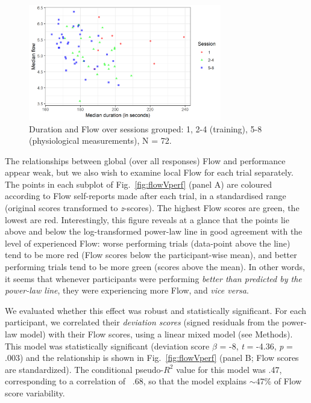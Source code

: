 \documentclass[fleqn,10pt]{wlscirep}
\newcommand{\nicewidth}{0.75\textwidth}
\begin{document}
\begin{figure}[!b]
  \centering
  \includegraphics[width=\nicewidth]{session_flowDuration_v3}
  \caption{Duration and Flow over sessions grouped: 1, 2-4 (training), 5-8 (physiological measurements), N = 72.}
  \label{fig:FlowVdurXssn}
\end{figure}

The relationships between global (over all responses) Flow and performance appear weak, but we also wish to examine local Flow for each trial separately. The points in each subplot of Fig.~\ref{fig:flowVperf} (panel A) are coloured according to Flow self-reports made after each trial, in a standardised range (original scores transformed to {\it z}-scores). The highest Flow scores are green, the lowest are red. Interestingly, this figure reveals at a glance that the points lie above and below the log-transformed power-law line in good agreement with the level of experienced Flow: worse performing trials (data-point above the line) tend to be more red (Flow scores below the participant-wise mean), and better performing trials tend to be more green (scores above the mean). In other words, it seems that whenever participants were performing {\it better than predicted by the power-law line}, they were experiencing more Flow, and {\it vice versa}.

We evaluated whether this effect was robust and statistically significant. For each participant, we correlated their {\it deviation scores} (signed residuals from the power-law model) with their Flow scores, using a linear mixed model (see Methods). This model was statistically significant (deviation score $\beta$ = -8, {\it t} = -4.36, {\it p} = .003) %
and the relationship is shown in Fig.~\ref{fig:flowVperf} (panel B; Flow scores are standardized). The conditional pseudo-$R^2$ value for this model was .47, corresponding to a correlation of ~.68, so that the model explains $\sim$47\% of Flow score variability.
\end{document}
